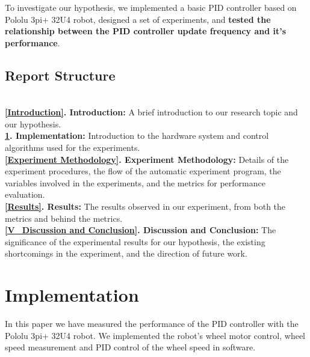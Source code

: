 \documentclass[conference]{IEEEtran}
\begin{document}
To investigate our hypothesis, we implemented a basic PID controller based on Pololu 3pi+ 32U4 robot, designed a set of experiments, and \textbf{tested the relationship between the PID controller update frequency and it's performance}.
\subsection{Report Structure}
\begin{enumerate}
    \\\textbf{\ref{Introduction}. Introduction:} A brief introduction to our research topic and our hypothesis.
    \\\textbf{\ref{Implementation}. Implementation:} Introduction to the hardware system and control algorithms used for the experiments.
    \\\textbf{\ref{Experiment Methodology}. Experiment Methodology:} Details of the experiment procedures, the flow of the automatic experiment program, the variables involved in the experiments, and the metrics for performance evaluation.
    \\\textbf{\ref{Results}. Results:} The results observed in our experiment, from both the metrics and behind the metrics.
    \\\textbf{\ref{V_Discussion and Conclusion}. Discussion and Conclusion:} The significance of the experimental results for our hypothesis, the existing shortcomings in the experiment, and the direction of future work.
    
\end{enumerate}





\section{Implementation}
\label{Implementation}
In this paper we have measured the performance of the PID controller with the Pololu 3pi+ 32U4 robot. We implemented the robot's wheel motor control, wheel speed measurement and PID control of the wheel speed in software.
\end{document}
